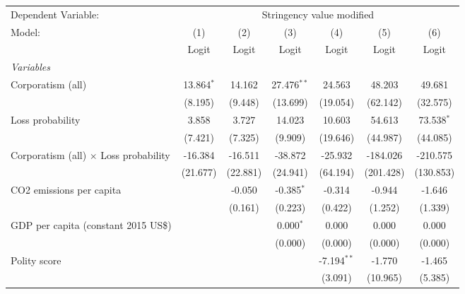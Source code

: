 
\begingroup
\centering
\begin{tabular}{lcccccc}
   \toprule
   Dependent Variable: & \multicolumn{6}{c}{Stringency value modified}\\
   Model:                                       & (1)          & (2)      & (3)           & (4)           & (5)       & (6)\\  
                                                &  Logit       & Logit    & Logit         & Logit         & Logit     & Logit\\  
   \midrule
   \emph{Variables}\\
   Corporatism (all)                            & 13.864$^{*}$ & 14.162   & 27.476$^{**}$ & 24.563        & 48.203    & 49.681\\   
                                                & (8.195)      & (9.448)  & (13.699)      & (19.054)      & (62.142)  & (32.575)\\   
   Loss probability                             & 3.858        & 3.727    & 14.023        & 10.603        & 54.613    & 73.538$^{*}$\\   
                                                & (7.421)      & (7.325)  & (9.909)       & (19.646)      & (44.987)  & (44.085)\\   
   Corporatism (all) $\times$ Loss probability  & -16.384      & -16.511  & -38.872       & -25.932       & -184.026  & -210.575\\   
                                                & (21.677)     & (22.881) & (24.941)      & (64.194)      & (201.428) & (130.853)\\   
   CO2 emissions per capita                     &              & -0.050   & -0.385$^{*}$  & -0.314        & -0.944    & -1.646\\   
                                                &              & (0.161)  & (0.223)       & (0.422)       & (1.252)   & (1.339)\\   
   GDP per capita (constant 2015 US\$)          &              &          & 0.000$^{*}$   & 0.000         & 0.000     & 0.000\\   
                                                &              &          & (0.000)       & (0.000)       & (0.000)   & (0.000)\\   
   Polity score                                 &              &          &               & -7.194$^{**}$ & -1.770    & -1.465\\   
                                                &              &          &               & (3.091)       & (10.965)  & (5.385)\\   

\end{tabular}
